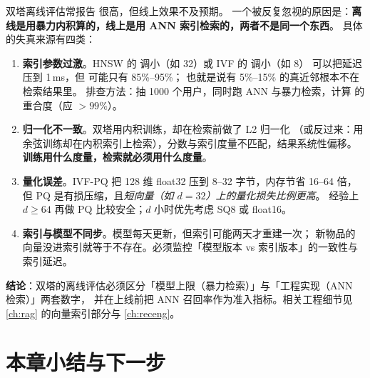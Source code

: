 \begin{pitfall}
双塔离线评估常报告  很高，但线上效果不及预期。
一个被反复忽视的原因是：\textbf{离线是用暴力内积算的，线上是用 ANN 索引检索的，两者不是同一个东西}。
具体的失真来源有四类：
\begin{enumerate}
  \item \textbf{索引参数过激}。HNSW 的  调小（如 32）或 IVF 的  调小（如 8）
        可以把延迟压到 1\,ms，但 可能只有 85\%--95\%；
        也就是说有 5\%--15\% 的真近邻根本不在检索结果里。
        排查方法：抽 1000 个用户，同时跑 ANN 与暴力检索，计算  的重合度（应 $>99\%$）。
  \item \textbf{归一化不一致}。双塔用内积训练，却在检索前做了 L2 归一化
        （或反过来：用余弦训练却在内积索引上检索），分数与索引度量不匹配，结果系统性偏移。
        \textbf{训练用什么度量，检索就必须用什么度量}。
  \item \textbf{量化误差}。IVF-PQ 把 128 维 float32 压到 8--32 字节，内存节省 16--64 倍，
        但 PQ 是有损压缩，且\emph{短向量（如 $d=32$）上的量化损失比例更高}。
        经验上 $d \ge 64$ 再做 PQ 比较安全；$d$ 小时优先考虑 SQ8 或 float16。
  \item \textbf{索引与模型不同步}。模型每天更新，但索引可能两天才重建一次；
        新物品的向量没进索引就等于不存在。必须监控「模型版本 vs 索引版本」的一致性与索引延迟。
\end{enumerate}
\textbf{结论}：双塔的离线评估必须区分「模型上限（暴力检索）」与「工程实现（ANN 检索）」两套数字，
并在上线前把 ANN 召回率作为准入指标。相关工程细节见 \cref{ch:rag} 的向量索引部分与 \cref{ch:receng}。
\end{pitfall}

\section{本章小结与下一步}

